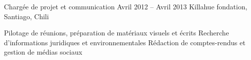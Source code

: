 \begin{joblist}
{{\begin{itemize}

		\end{itemize}
		}
	}

\item[Chargée de projet et communication ]{Avril 2012 -- Avril 2013 }     
  	{
  	Killahue fondation, Santiago, Chili
  	}     
  	{
        \normalsize{
		\iftbftiny \vspace{-0.5cm} \fi
		\begin{itemize}
			  \iftbftiny \setlength\itemsep{-3pt} \fi
			  \cvitem[\checkmark] Pilotage de réunions, préparation de matériaux visuels et écrits                                        
			  \cvitem[\checkmark] Recherche d'informations juridiques et environnementales
			  \cvitem[\checkmark] Rédaction de comptes-rendus et gestion de médias sociaux                                         
		\end{itemize}  
		}
	}

   

\end{joblist}


%
%


